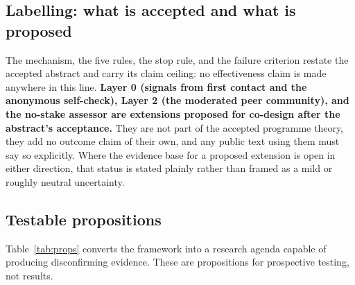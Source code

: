 \subsection{Labelling: what is accepted and what is proposed}
The mechanism, the five rules, the stop rule, and the failure criterion restate the accepted abstract
and carry its claim ceiling: no effectiveness claim is made anywhere in this line. \textbf{Layer 0
(signals from first contact and the anonymous self-check), Layer 2 (the moderated peer community), and
the no-stake assessor are extensions proposed for co-design after the abstract's acceptance.} They are
not part of the accepted programme theory, they add no outcome claim of their own, and any public text
using them must say so explicitly. Where the evidence base for a proposed extension is open in either
direction, that status is stated plainly rather than framed as a mild or roughly neutral uncertainty.

\subsection{Testable propositions}
Table~\ref{tab:props} converts the framework into a research agenda capable of producing disconfirming
evidence. These are propositions for prospective testing, not results.

